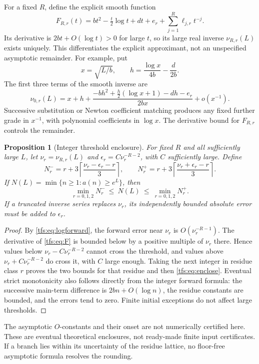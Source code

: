 \documentclass[11pt,a4paper]{article}
\numberwithin{equation}{section}
\newtheorem{proposition}[theorem]{Proposition}
\theoremstyle{remark}
\newcommand{\1}{\mathbf 1}
\newcommand{\ceil}[1]{\left\lceil #1\right\rceil}
\begin{document}
For a fixed $R$, define the explicit smooth function
\begin{equation}\label{tfs:eq:F}
F_{R,r}(t)=bt^2-\tfrac t2\log t+dt+e_r
                         +\sum_{j=1}^R\ell_{j,r}t^{-j}.
\end{equation}
Its derivative is $2bt+O(\log t)>0$ for large $t$, so its large real inverse
$\nu_{R,r}(L)$ exists uniquely. This differentiates the explicit
approximant, not an unspecified asymptotic remainder.
For example, put
\[
x=\sqrt{L/b},\qquad h=\frac{\log x}{4b}-\frac d{2b}.
\]
The first three terms of the smooth inverse are
\begin{equation}\label{tfs:eq:inverse}
\nu_{0,r}(L)=x+h+
 \frac{-bh^2+\tfrac h2(\log x+1)-dh-e_r}{2bx}+o(x^{-1}).
\end{equation}
Successive substitution or Newton coefficient matching produces any
fixed further grade in $x^{-1}$, with polynomial coefficients in
$\log x$. The derivative bound for $F_{R,r}$ controls the remainder.

\begin{proposition}[Integer threshold enclosure]\label{tfs:prop:inverse}
For fixed $R$ and all sufficiently large $L$, let
$\nu_r=\nu_{R,r}(L)$ and $\epsilon_r=C\nu_r^{-R-2}$, with $C$
sufficiently large. Define
\[
N_r^- =r+3\ceil{\frac{\nu_r-\epsilon_r-r}{3}},\qquad
N_r^+ =r+3\ceil{\frac{\nu_r+\epsilon_r-r}{3}}.
\]
If $N(L)=\min\{n\geq1:a(n)\geq e^L\}$, then
\begin{equation}\label{tfs:eq:enclose}
\min_{r=0,1,2}N_r^-\ \leq\ N(L)\ \leq\ \min_{r=0,1,2}N_r^+.
\end{equation}
If a truncated inverse series replaces $\nu_r$, its independently bounded
absolute error must be added to $\epsilon_r$.
\end{proposition}
\begin{proof}
By \eqref{tfs:eq:logforward}, the forward error near $\nu_r$ is
$O(\nu_r^{-R-1})$. The derivative of \eqref{tfs:eq:F} is bounded below by a
positive multiple of $\nu_r$ there. Hence values below
$\nu_r-C\nu_r^{-R-2}$ cannot cross the threshold, and values above
$\nu_r+C\nu_r^{-R-2}$ do cross it, with $C$ large enough.
Taking the next integer in residue class $r$ proves the two bounds for
that residue and then \eqref{tfs:eq:enclose}. Eventual strict monotonicity
also follows directly from the integer forward formula: the successive
main-term difference is $2bn+O(\log n)$, the residue constants are bounded,
and the errors tend to zero. Finite initial exceptions do not affect
large thresholds.
\end{proof}
The asymptotic $O$-constants and their onset are not numerically certified
here. These are eventual theoretical enclosures, not ready-made finite
input certificates. If a branch lies within its uncertainty of the
residue lattice, no floor-free asymptotic formula resolves the rounding.
\end{document}
